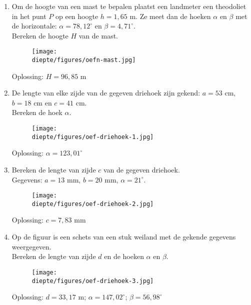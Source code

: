 \documentclass[a4paper,12pt]{article}
\newcommand{\diepte}{./}
\begin{document}
\begin{enumerate}
\item Om de hoogte van een mast te bepalen plaatst een landmeter een theodoliet in het punt $P$ op een hoogte $h=1,65$ m. Ze meet dan de hoeken $\alpha$ en $\beta$ met de horizontale: $\alpha=78,12^\circ$ en $\beta=4,71^\circ$.\\
    Bereken de hoogte $H$ van de mast.
    
\begin{figure}[h]
\begin{center}
\texttt{[image: \\diepte/figures/oefn-mast.jpg]}
\end{center}
\end{figure}

Oplossing: $H=96,85$ m

\item De lengte van elke zijde van de gegeven driehoek zijn gekend: $a=53$ cm, \\ $b=18$ cm en $c=41$ cm.\\
Bereken de hoek $\alpha$.

\begin{figure}[h]
\begin{center}
\texttt{[image: \\diepte/figures/oef-driehoek-1.jpg]}
\end{center}
\end{figure}

Oplossing: $\alpha=123,01^\circ$ 

\item Bereken de lengte van zijde $c$ van de gegeven driehoek.\\
Gegevens: $a=13$ mm, $b=20$ mm, $\alpha=21^\circ$. 

\begin{figure}[h]
\begin{center}
\texttt{[image: \\diepte/figures/oef-driehoek-2.jpg]}
\end{center}
\end{figure}

Oplossing: $c=7,83$ mm

\item Op de figuur is een schets van een stuk weiland met de gekende gegevens weergegeven. \\
Bereken de lengte van zijde $d$ en de hoeken $\alpha$ en $\beta$.

\begin{figure}[h]
\begin{center}
\texttt{[image: \\diepte/figures/oef-driehoek-3.jpg]}
\end{center}
\end{figure}

Oplossing: $d=33,17$ m; $\alpha=147,02^\circ$; $\beta=56,98^\circ$

\end{enumerate}
\end{document}
